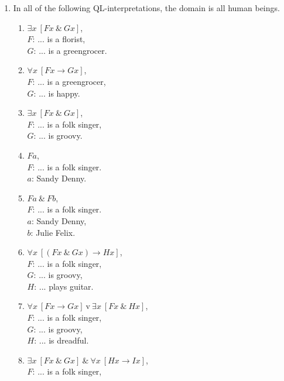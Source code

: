 \documentclass[a4paper,12pt]{article}
\newcommand{\ra}{\rightarrow}
\newcommand{\tv}{ \ \textrm{v} \ }
\newcommand{\ta}{ \ \& \ }
\newcommand{\all}{\forall}
\newcommand{\ex}{\exists}
\begin{document}
    \begin{enumerate}[label=\arabic*,leftmargin=*]
        \item In all of the following QL-interpretations, the domain is all human beings.
            \begin{enumerate}[label=(\roman*),leftmargin=*]
                \item $\ex x \ [Fx \ta Gx]$,\\
                    $F$: ... is a florist,\\
                    $G$: ... is a greengrocer.
                \item $\all x \ [Fx \ra Gx]$,\\
                    $F$: ... is a greengrocer,\\
                    $G$: ... is happy.
                \item $\ex x \ [Fx \ta Gx]$,\\
                    $F$: ... is a folk singer,\\
                    $G$: ... is groovy.
                \item $Fa$,\\
                    $F$: ... is a folk singer.\\
                    $a$: Sandy Denny.
                \item $Fa \ta Fb$,\\
                    $F$: ... is a folk singer.\\
                    $a$: Sandy Denny,\\
                    $b$: Julie Felix.
                \item $\all x \ [(Fx \ta Gx) \ra Hx]$,\\
                    $F$: ... is a folk singer,\\
                    $G$: ... is groovy,\\
                    $H$: ... plays guitar.
                \item $\all x \ [Fx \ra Gx] \tv \ex x \ [Fx \ta Hx]$,\\
                    $F$: ... is a folk singer,\\
                    $G$: ... is groovy,\\
                    $H$: ... is dreadful.
                \item $\ex x \ [Fx \ta Gx] \ta \all x \ [Hx \ra Ix]$,\\
                    $F$: ... is a folk singer,\\

\end{enumerate}
\end{enumerate}
\end{document}
